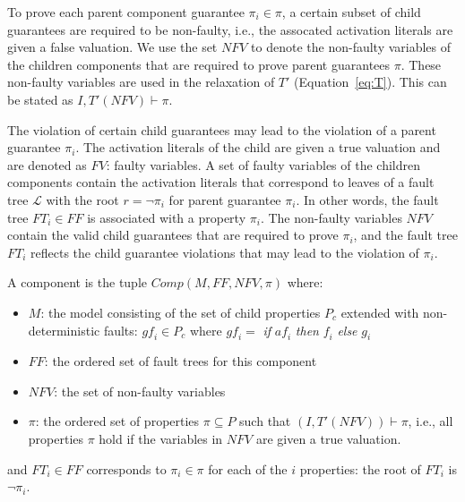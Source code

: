 
To prove each parent component guarantee $\pi_i \in \pi$, a certain subset of child guarantees are required to be non-faulty, i.e., the assocated activation literals are given a false valuation. We use the set $\mathit{NFV}$ to denote the non-faulty variables of the children components that are required to prove parent guarantees $\pi$.  These non-faulty variables are used in the relaxation of $T'$ (Equation~\ref{eq:T}). This can be stated as $I,T'(\mathit{NFV}) \vdash \pi$. 

The violation of certain child guarantees may lead to the violation of a parent guarantee $\pi_i$. The activation literals of the child are given a true valuation and are denoted as $\mathit{FV}$: faulty variables. A set of faulty variables of the children components contain the activation literals that correspond to leaves of a fault tree $\mathcal{L}$ with the root $r = \neg \pi_i$ for parent guarantee $\pi_i$. In other words, the fault tree $\mathit{FT_i} \in \mathit{FF}$ is associated with a property $\pi_i$. The non-faulty variables $\mathit{NFV}$ contain the valid child guarantees that are required to prove $\pi_i$, and the fault tree $\mathit{FT_i}$ reflects the child guarantee violations that may lead to the violation of $\pi_i$.


\begin{definition}
A component is the tuple $\mathit{Comp}(M, \mathit{FF}, \mathit{NFV}, \pi)$ where:
\begin{itemize}[label=\textbullet]
\item $M$: the model consisting of the set of child properties $P_c$ extended with non-deterministic faults: $\mathit{gf_i} \in P_c$ where $\mathit{gf_i} =$ \textit{if} $\mathit{af_i}$ \textit{then} $\mathit{f}_i$ \textit{else} $g_i$
\item $\mathit{FF}$: the ordered set of fault trees for this component
\item $\mathit{NFV}$: the set of non-faulty variables 
\item $\pi$: the ordered set of properties $\pi \subseteq P$ such that $(I, T'(\mathit{NFV})) \vdash \pi$, i.e., all properties $\pi$ hold if the variables in $\mathit{NFV}$ are given a true valuation.
\end{itemize}
and $\mathit{FT}_i \in \mathit{FF}$ corresponds to $\pi_i \in \pi$ for each of the $i$ properties: the root of $\mathit{FT_i}$ is $\neg \pi_i$. 
\end{definition}


